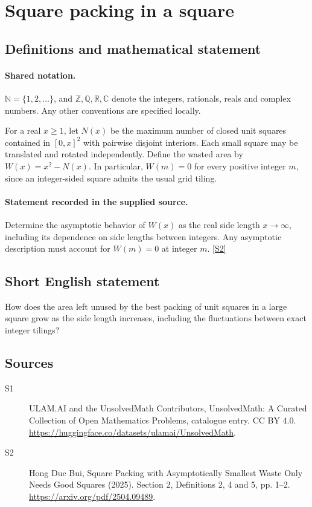 \documentclass[11pt]{article}
\newcommand{\sref}[2]{\hyperlink{source:#1:#2}{[S#2]}}
\begin{document}
\section{Square packing in a square}\label{statement}

\subsection{Definitions and mathematical statement}

\paragraph{Shared notation.}$\mathbb N=\{1,2,\ldots\}$, and $\mathbb Z,\mathbb Q,\mathbb R,\mathbb C$ denote the integers, rationals, reals and complex numbers. Any other conventions are specified locally.


For a real $x\geq1$, let $N(x)$ be the maximum number of closed unit squares contained in $[0,x]^2$ with pairwise disjoint interiors. Each small square may be translated and rotated independently. Define the wasted area by $W(x)=x^2-N(x)$. In particular, $W(m)=0$ for every positive integer $m$, since an integer-sided square admits the usual grid tiling.
\paragraph{Statement recorded in the supplied source.}
Determine the asymptotic behavior of $W(x)$ as the real side length $x\to\infty$, including its dependence on side lengths between integers. Any asymptotic description must account for $W(m)=0$ at integer $m$. \sref{statement}{2}
\subsection{Short English statement}
How does the area left unused by the best packing of unit squares in a large square grow as the side length increases, including the fluctuations between exact integer tilings?
\subsection{Sources}
\begin{description}
\item[\hypertarget{source:statement:1}{S1}] ULAM.AI and the UnsolvedMath Contributors, UnsolvedMath: A Curated Collection of Open Mathematics Problems, catalogue entry. CC BY 4.0. \url{https://huggingface.co/datasets/ulamai/UnsolvedMath}.
\item[\hypertarget{source:statement:2}{S2}] Hong Duc Bui, Square Packing with Asymptotically Smallest Waste Only Needs Good Squares (2025). Section 2, Definitions 2, 4 and 5, pp. 1–2. \url{https://arxiv.org/pdf/2504.09489}.
\end{description}
\label{end:statement}
\end{document}
